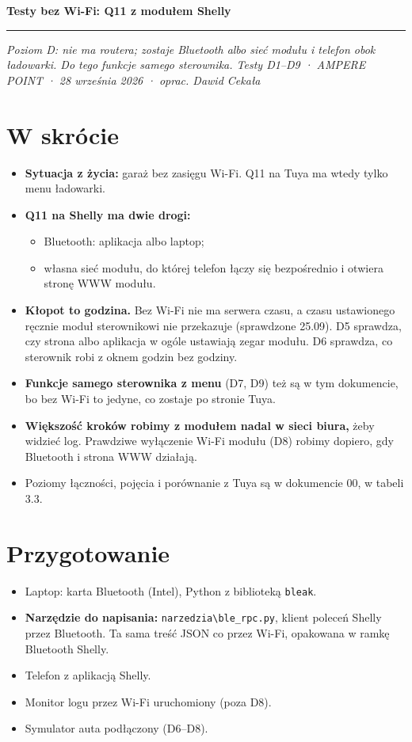 \documentclass[11pt,a4paper]{article}
\begin{document}
{\LARGE\bfseries Testy bez Wi-Fi: Q11 z modułem Shelly\par}
\vspace{4pt}\textcolor{apteal}{\rule{\textwidth}{1.2pt}}
\emph{Poziom D: nie ma routera; zostaje Bluetooth albo sieć modułu i telefon obok ładowarki. Do tego funkcje samego sterownika. Testy D1–D9 · AMPERE POINT · 28 września 2026 · oprac. Dawid Cekała}


\section*{W skrócie}

\begin{itemize}
\item \textbf{Sytuacja z życia:} garaż bez zasięgu Wi-Fi. Q11 na Tuya ma wtedy tylko menu ładowarki.
\item \textbf{Q11 na Shelly ma dwie drogi:}
\begin{itemize}
\item Bluetooth: aplikacja albo laptop;
\item własna sieć modułu, do której telefon łączy się bezpośrednio i otwiera stronę WWW modułu.
\end{itemize}
\item \textbf{Kłopot to godzina.} Bez Wi-Fi nie ma serwera czasu, a czasu ustawionego ręcznie moduł sterownikowi nie przekazuje (sprawdzone 25.09). D5 sprawdza, czy strona albo aplikacja w ogóle ustawiają zegar modułu. D6 sprawdza, co sterownik robi z oknem godzin bez godziny.
\item \textbf{Funkcje samego sterownika z menu} (D7, D9) też są w tym dokumencie, bo bez Wi-Fi to jedyne, co zostaje po stronie Tuya.
\item \textbf{Większość kroków robimy z modułem nadal w sieci biura,} żeby widzieć log. Prawdziwe wyłączenie Wi-Fi modułu (D8) robimy dopiero, gdy Bluetooth i strona WWW działają.
\item Poziomy łączności, pojęcia i porównanie z Tuya są w dokumencie 00, w tabeli 3.3.
\end{itemize}

\section{Przygotowanie}

\begin{itemize}
\item Laptop: karta Bluetooth (Intel), Python z biblioteką \texttt{bleak}.
\item \textbf{Narzędzie do napisania:} \texttt{narzedzia\textbackslash{}ble\_\allowbreak{}rpc.\allowbreak{}py}, klient poleceń Shelly przez Bluetooth. Ta sama treść JSON co przez Wi-Fi, opakowana w ramkę Bluetooth Shelly.
\item Telefon z aplikacją Shelly.
\item Monitor logu przez Wi-Fi uruchomiony (poza D8).
\item Symulator auta podłączony (D6–D8).
\end{itemize}
\end{document}
